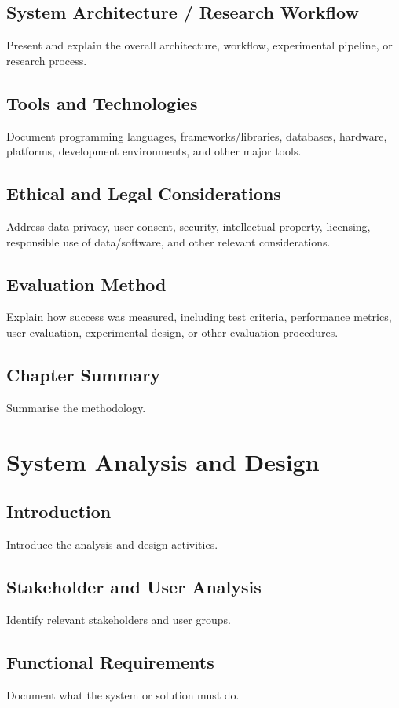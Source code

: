 \documentclass[12pt,a4paper]{report}
\begin{document}
\section{System Architecture / Research Workflow}
Present and explain the overall architecture, workflow, experimental pipeline, or research process.

\section{Tools and Technologies}
Document programming languages, frameworks/libraries, databases, hardware, platforms, development environments, and other major tools.

\section{Ethical and Legal Considerations}
Address data privacy, user consent, security, intellectual property, licensing, responsible use of data/software, and other relevant considerations.

\section{Evaluation Method}
Explain how success was measured, including test criteria, performance metrics, user evaluation, experimental design, or other evaluation procedures.

\section{Chapter Summary}
Summarise the methodology.

\chapter{System Analysis and Design}

\section{Introduction}
Introduce the analysis and design activities.

\section{Stakeholder and User Analysis}
Identify relevant stakeholders and user groups.

\section{Functional Requirements}
Document what the system or solution must do.
\end{document}
